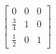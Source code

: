 \[
  \left[
  \begin{array}{ccc}
	  0 & 0 & 0 \\
	  \frac{3}{4} & 1 & 0 \\
	  \frac{1}{2} & 0 & 1
  \end{array}
  \right]
  \]